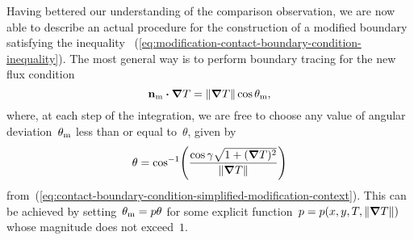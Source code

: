 Having bettered our understanding of the comparison observation,
we are now able to describe an actual procedure
for the construction of a modified boundary
satisfying the inequality~%
  (\ref{eq:modification-contact-boundary-condition-inequality}).
The most general way
is to perform boundary tracing
for the new flux condition
\begin{equation}
  \mathop{}\!\boldsymbol{\mathbf{n}}_{\mathrm{m}} \boldsymbol{\cdot} \mathop{}\!\boldsymbol{\mathbf{\nabla}} T = \lVert\mathop{}\!\boldsymbol{\mathbf{\nabla}} T\rVert \cos\theta_{\mathrm{m}},
  \label{eq:modification-boundary-condition}
\end{equation}
where, at each step of the integration,
we are free to choose any value of angular deviation~$\theta_{\mathrm{m}}$
less than or equal to~$\theta$,
given by
\begin{equation}
  \theta =
    \cos^{-1} \roundbr*{
      \frac{\cos\gamma \sqrt{1 + (\del T)^2}}{\norm{\del T}}
    }
  \label{eq:contact-boundary-condition-deviation}
\end{equation}
from~(\ref{eq:contact-boundary-condition-simplified-modification-context}).
This can be achieved by setting~$\theta_{\mathrm{m}} = p \theta$
for some explicit function~$p = p (x, y, T, \lVert\mathop{}\!\boldsymbol{\mathbf{\nabla}} T\rVert)$
whose magnitude does not exceed~$1$.

